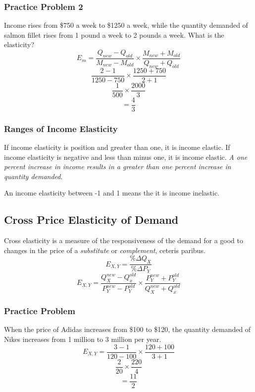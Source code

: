 \documentclass[letterpaper, 12pt]{article}
\begin{document}
\subsubsection{Practice Problem 2}
Income rises from \$750 a week to \$1250 a week, while the quantity demanded of
salmon fillet rises from 1 pound a week to 2 pounds a week. What is the
elasticity?
\[ E_{m} = \frac{Q_{new}-Q_{old}}{M_{new}-M_{old}}\times
           \frac{M_{new}+M_{old}}{Q_{new}+Q_{old}} \]
\[ \frac{2-1}{1250-750}\times\frac{1250+750}{2+1} \]
\[ \frac{1}{500}\times\frac{2000}{3} \]
\[ = \frac{4}{3} \]

\subsubsection{Ranges of Income Elasticity}
If income elasticity is position and greater than one, it is income elastic.
If income elasticity is negative and less than minus one, it is income elastic.
\textit{A one percent increase in income results in a greater than one percent
increase in quantity demanded}. \par
An income elasticity between -1 and 1 means the it is income inelastic.

\subsection{Cross Price Elasticity of Demand}
Cross elasticity is a measure of the responsiveness of the demand for a good
to changes in the price of a \textit{substitute} or \textit{complement},
ceteris paribus.
\[ E_{X,Y} = \frac{\%\Delta Q_{X}}{\%\Delta P_{Y}} \]
\[ E_{X,Y} = \frac{Q_{X}^{new}-Q_{x}^{old}}{P_{Y}^{new}-P_{Y}^{old}}\times
             \frac{P_{Y}^{new}+P_{Y}^{old}}{Q_{X}^{new}+Q_{x}^{old}} \]

\subsubsection{Practice Problem}
When the price of Adidas increases from \$100 to \$120, the quantity demanded
of Nikes increases from 1 million to 3 million per year.
\[ E_{X,Y} = \frac{3-1}{120-100}\times\frac{120+100}{3+1} \]
\[ \frac{2}{20}\times\frac{220}{4} \]
\[ = \frac{11}{2} \]
\end{document}
